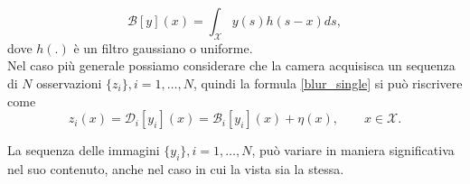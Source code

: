 \begin{equation}
\label{blur_convolution}
\mathcal{B}[y](x) = \int_{\mathcal{X}}y(s)h(s-x)ds,
\end{equation}
dove $h(.)$ \`e un filtro gaussiano o uniforme.\\
Nel caso pi\`u generale possiamo considerare che la camera acquisisca un sequenza di $N$ osservazioni $\{z_i\}, i = 1, \dots ,N$, quindi la formula \ref{blur_single} si pu\`o riscrivere come
\begin{equation}
\label{blur_multi}
z_i(x)=\mathcal{D}_i[y_i](x) = \mathcal{B}_i[y_i](x) + \eta(x), \qquad x \in \mathcal{X}.
\end{equation}

La sequenza delle immagini $\{y_i\}, i = 1,\dots , N$, pu\`o variare in maniera significativa nel suo contenuto, anche nel caso in cui la vista sia la stessa.
